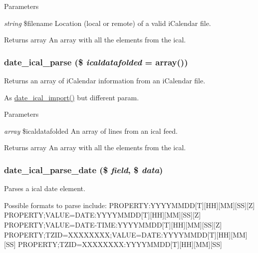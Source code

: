 \begin{DoxyParams}{Parameters}
\item[{\em string}]\$filename Location (local or remote) of a valid iCalendar file.\end{DoxyParams}
\begin{DoxyReturn}{Returns}
array An array with all the elements from the ical. 
\end{DoxyReturn}
\hypertarget{date__api__ical_8inc_af4aa5783fc7056e99b6e0fc0d981cda4}{
\subsubsection[{date\_\-ical\_\-parse}]{\setlength{\rightskip}{0pt plus 5cm}date\_\-ical\_\-parse (\$ {\em icaldatafolded} = {\ttfamily array()})}}
\label{date__api__ical_8inc_af4aa5783fc7056e99b6e0fc0d981cda4}
Returns an array of iCalendar information from an iCalendar file.

As \hyperlink{date__api__ical_8inc_a9c32ef84b7717c5f5b9333a14aab9e17}{date\_\-ical\_\-import()} but different param.


\begin{DoxyParams}{Parameters}
\item[{\em array}]\$icaldatafolded An array of lines from an ical feed.\end{DoxyParams}
\begin{DoxyReturn}{Returns}
array An array with all the elements from the ical. 
\end{DoxyReturn}
\hypertarget{date__api__ical_8inc_a043a6a7b1c9724a27cd16750f01492c4}{
\subsubsection[{date\_\-ical\_\-parse\_\-date}]{\setlength{\rightskip}{0pt plus 5cm}date\_\-ical\_\-parse\_\-date (\$ {\em field}, \/  \$ {\em data})}}
\label{date__api__ical_8inc_a043a6a7b1c9724a27cd16750f01492c4}
Parses a ical date element.

Possible formats to parse include: PROPERTY:YYYYMMDD\mbox{[}T\mbox{]}\mbox{[}HH\mbox{]}\mbox{[}MM\mbox{]}\mbox{[}SS\mbox{]}\mbox{[}Z\mbox{]} PROPERTY;VALUE=DATE:YYYYMMDD\mbox{[}T\mbox{]}\mbox{[}HH\mbox{]}\mbox{[}MM\mbox{]}\mbox{[}SS\mbox{]}\mbox{[}Z\mbox{]} PROPERTY;VALUE=DATE-\/TIME:YYYYMMDD\mbox{[}T\mbox{]}\mbox{[}HH\mbox{]}\mbox{[}MM\mbox{]}\mbox{[}SS\mbox{]}\mbox{[}Z\mbox{]} PROPERTY;TZID=XXXXXXXX;VALUE=DATE:YYYYMMDD\mbox{[}T\mbox{]}\mbox{[}HH\mbox{]}\mbox{[}MM\mbox{]}\mbox{[}SS\mbox{]} PROPERTY;TZID=XXXXXXXX:YYYYMMDD\mbox{[}T\mbox{]}\mbox{[}HH\mbox{]}\mbox{[}MM\mbox{]}\mbox{[}SS\mbox{]}

